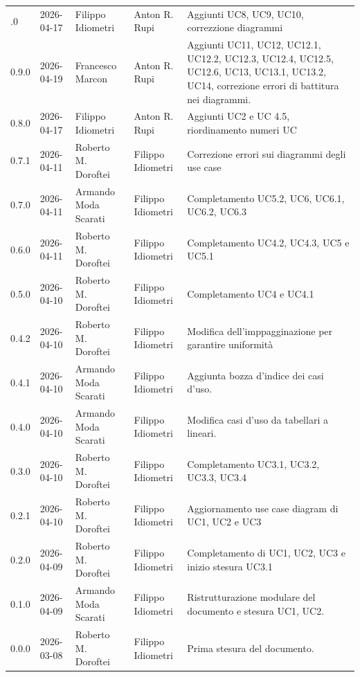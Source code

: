 \begin{longtable}{>{\ttfamily\small}l l l l >{\raggedright\arraybackslash}p{5cm}}
    \bottomrule
    \endlastfoot
    0.10.0 & 2026-04-17 & Filippo Idiometri & Anton R. Rupi & Aggiunti UC8, UC9, UC10, correzzione diagrammi \\
    0.9.0 & 2026-04-19 & Francesco Marcon & Anton R. Rupi & Aggiunti UC11, UC12, UC12.1, UC12.2, UC12.3, UC12.4, UC12.5, UC12.6, UC13, UC13.1, UC13.2, UC14, correzione errori di battitura nei diagrammi. \\
    0.8.0 & 2026-04-17 & Filippo Idiometri & Anton R. Rupi & Aggiunti UC2 e UC 4.5, riordinamento numeri UC \\
    0.7.1 & 2026-04-11 & Roberto M. Doroftei & Filippo Idiometri & Correzione errori sui diagrammi degli use case \\
    0.7.0 & 2026-04-11 & Armando Moda Scarati & Filippo Idiometri & Completamento UC5.2, UC6, UC6.1, UC6.2, UC6.3 \\
    0.6.0 & 2026-04-11 & Roberto M. Doroftei & Filippo Idiometri & Completamento UC4.2, UC4.3, UC5 e UC5.1 \\
    0.5.0 & 2026-04-10 & Roberto M. Doroftei & Filippo Idiometri & Completamento UC4 e UC4.1 \\
    0.4.2 & 2026-04-10 & Roberto M. Doroftei & Filippo Idiometri & Modifica dell'imppagginazione per garantire uniformità \\
    0.4.1 & 2026-04-10 & Armando Moda Scarati & Filippo Idiometri & Aggiunta bozza d'indice dei casi d'uso. \\
    0.4.0 & 2026-04-10 & Armando Moda Scarati & Filippo Idiometri & Modifica casi d'uso da tabellari a lineari. \\
    0.3.0 & 2026-04-10 & Roberto M. Doroftei & Filippo Idiometri & Completamento UC3.1, UC3.2, UC3.3, UC3.4 \\
    0.2.1 & 2026-04-10 & Roberto M. Doroftei & Filippo Idiometri & Aggiornamento use case diagram di UC1, UC2 e UC3 \\
    0.2.0 & 2026-04-09 & Roberto M. Doroftei & Filippo Idiometri & Completamento di UC1, UC2, UC3 e inizio stesura UC3.1 \\
    0.1.0 & 2026-04-09 & Armando Moda Scarati & Filippo Idiometri & Ristrutturazione modulare del documento e stesura UC1, UC2. \\
    0.0.0 & 2026-03-08 & Roberto M. Doroftei & Filippo Idiometri & Prima stesura del documento. \\
\end{longtable}